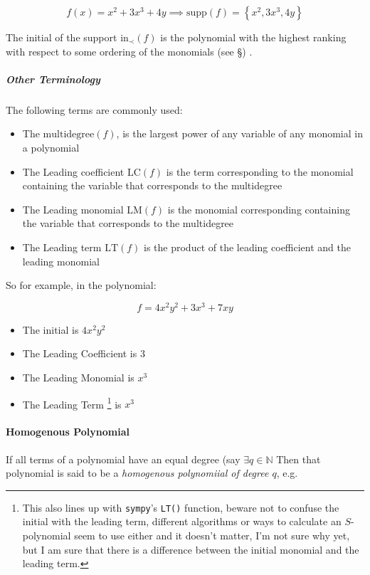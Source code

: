 \documentclass[a4paper,11pt,twoside]{article}
\begin{document}
\[
     f(x) = x^2+3x^3+4y \implies \mathrm{supp}\left(f\right) =
     \left\{x^2, 3x^3, 4y\right\}
     \]

The initial of the support \(\mathrm{in}_{\prec}\left(f\right)\)
is the polynomial with the highest ranking with respect to some
ordering of the monomials (see \S ) \cite[1.1.5]{hibiGrobnerBasesStatistics2014}.



\subparagraph{Other Terminology}
\label{sec:orgd96e70d}

The following terms are commonly used: \cite[\S 2.2]{coxIdealsVarietiesAlgorithms1997}

\begin{itemize}
\item The \(\mathrm{multidegree}\left(f\right)\), is the
largest power of any variable of any monomial in a polynomial
\item The Leading coefficient \(\mathrm{LC}\left(f\right)\) is the
term corresponding to the monomial containing the variable
that corresponds to the multidegree
\item The Leading monomial \(\mathrm{LM}\left(f\right)\) is the
monomial corresponding containing the variable
that corresponds to the multidegree
\item The Leading term \(\mathrm{LT}\left(f\right)\) is the product
of the leading coefficient and the leading monomial
\end{itemize}

So for example, in the polynomial:

\[
	f= 4x^2y^2 + 3x^3 + 7xy
	\]

\begin{itemize}
\item The initial is \(4x^2y^2\)
\item The Leading Coefficient is 3
\item The Leading Monomial is \(x^3\)
\item The Leading Term \footnote{This also lines up with \texttt{sympy}'s \texttt{LT()} function, beware not to
confuse the initial with the leading term, different algorithms or
ways to calculate an \(S\)-polynomial seem to use either and it
doesn't matter, I'm not sure why yet, but I am sure that there is a
difference between the initial monomial and the leading term.} is \(x^3\)
\end{itemize}




\paragraph{Homogenous Polynomial}
\label{sec:org197934c}
If all terms of a polynomial have an equal degree (say \(\exists q
     \in \mathbb{N}\) Then that polynomial is said to be a \emph{homogenous
polynomiial of degree \(q\)}, e.g.
\end{document}
